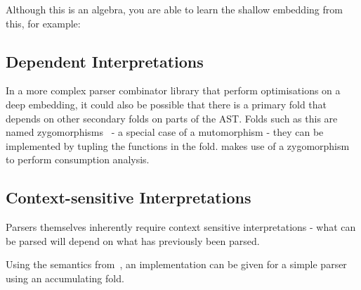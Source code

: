 \documentclass[a4paper, twocolumn, 10pt]{extarticle}
\newcommand\codeskip{\mskip\codemuskip}%
\let\codefont\textsf
\newcommand{\Conid}[1]{\mathit{#1}}
\newcommand{\Varid}[1]{\mathit{#1}}
\def\resethooks{%
  \global\let\SaveRestoreHook\empty
  \global\let\ColumnHook\empty}
\let\hspre\empty
\let\hspost\empty
\renewcommand\Varid[1]{\codefont{#1}}
\let\Conid\Varid
\begin{document}
Although this is an algebra, you are able to learn the shallow embedding from this, for example:

\resethooks

\subsection{Dependent Interpretations}

In a more complex parser combinator library that perform optimisations on a deep embedding,
it could also be possible that there is a primary fold that depends on other secondary folds on parts of the AST.
Folds such as this are named zygomorphisms~\cite{Fokkinga1989TuplingAM} - a special case of a mutomorphism -
they can be implemented by tupling the functions in the fold.
\citet{parsley} makes use of a zygomorphism to perform consumption analysis.


\subsection{Context-sensitive Interpretations}


Parsers themselves inherently require context sensitive interpretations - what can be parsed will
depend on what has previously been parsed.

Using the semantics from~\citet{wuYoda}, an implementation can be given for a simple parser using an accumulating fold.
\end{document}

